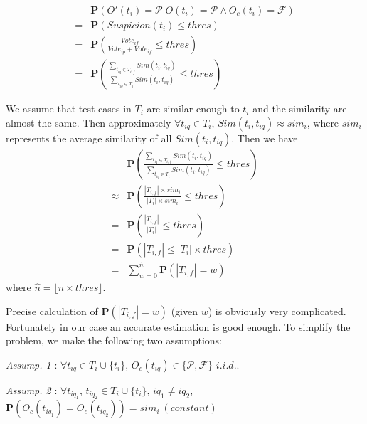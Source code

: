 \begin{equation}
\label{equ: P | P and F}
\begin{aligned}
& \mathbf{P}(O'(t_i) = \mathcal{P} | O(t_i) = \mathcal{P} \wedge O_c(t_i) = \mathcal{F}) \\
= & \mathbf{P}(Suspicion(t_i) \le thres) \\
= & \mathbf{P}(\frac{Vote_{if}}{Vote_{ip} + Vote_{if}} \le thres) \\
= & \mathbf{P}(\frac{\sum_{t_{iq}\in T_{i,f}}^{}Sim(t_i, t_{iq})}{\sum_{t_{iq}\in T_i}^{}Sim(t_i, t_{iq})} \le thres)
\end{aligned}
\end{equation}

We assume that test cases in $T_i$ are similar enough to $t_i$ and the similarity are almost the same. Then approximately $\forall t_{iq} \in T_i$, $Sim(t_i, t_{iq}) \approx {sim}_i$, where $sim_i$ represents the average similarity of all $Sim(t_i, t_{iq})$. Then we have
\begin{equation}
\label{equ: sigma w}
\begin{aligned}
& \mathbf{P}(\frac{\sum_{t_{iq}\in T_{i,f}}^{}Sim(t_i, t_{iq})}{\sum_{t_{iq}\in T_i}^{}Sim(t_i, t_{iq})} \le thres) \\
\approx & \mathbf{P}(\frac{|T_{i,f}| \times {sim}_i}{|T_i| \times {sim}_i} \le thres) \\
= & \mathbf{P}(\frac{|T_{i,f}|}{|T_i|} \le thres) \\
= & \mathbf{P} (|T_{i,f}| \le |T_i| \times thres) \\
= & \sum_{w = 0}^{\hat{n}}{\mathbf{P}(|T_{i,f}| = w)}
\end{aligned}
\end{equation}
where $\hat{n} = \lfloor n \times thres \rfloor$.

Precise calculation of $\mathbf{P}(|T_{i,f}| = w)$ (given $w$) is obviously very complicated. Fortunately in our case an accurate estimation is good enough. To simplify the problem, we make the following two assumptions:

\textit{Assump. 1} : $\forall t_{iq}\in T_i \cup \{t_i\}$, $O_c(t_{iq}) \in \{\mathcal{P}, \mathcal{F}\}$  $i.i.d.$.

\textit{Assump. 2} : $\forall t_{iq_1}$, $t_{iq_2} \in T_i \cup \{t_i\}$, $iq_1 \ne iq_2$, $\mathbf{P}(O_c(t_{iq_1}) = O_c(t_{iq_2})) = {sim}_i\  (constant)$

